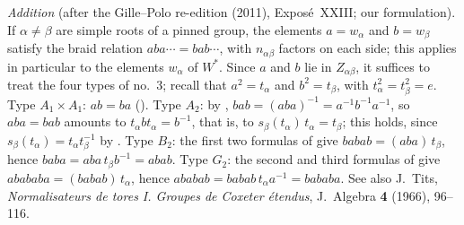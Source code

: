\emph{Addition} (after the Gille--Polo re-edition (2011), Exposé~XXIII; our
formulation). If \(\alpha\ne\beta\) are simple roots of a pinned group, the elements
\(a=w_\alpha\) and \(b=w_\beta\) satisfy the braid relation \(aba\cdots=bab\cdots\),
with \(n_{\alpha\beta}\) factors on each side; this applies in particular to the elements
\(w_\alpha\) of \(W^*\). Since \(a\) and \(b\) lie in \(Z_{\alpha\beta}\), it suffices to
treat the four types of no.~3; recall that \(a^2=t_\alpha\) and \(b^2=t_\beta\), with
\(t_\alpha^2=t_\beta^2=e\). Type \(A_1\times A_1\): \(ab=ba\)
(). Type \(A_2\): by
, \(bab=(aba)^{-1}=a^{-1}b^{-1}a^{-1}\), so
\(aba=bab\) amounts to \(t_\alpha bt_\alpha=b^{-1}\), that is, to
\(s_\beta(t_\alpha)\,t_\alpha=t_\beta\); this holds, since
\(s_\beta(t_\alpha)=t_\alpha t_\beta^{-1}\) by
. Type \(B_2\): the first two formulas of
 give \(babab=(aba)\,t_\beta\), hence
\(baba=aba\,t_\beta b^{-1}=abab\). Type \(G_2\): the second and third formulas of
 give \(abababa=(babab)\,t_\alpha\), hence
\(ababab=babab\,t_\alpha a^{-1}=bababa\). See also J.~Tits, \textit{Normalisateurs de
tores I. Groupes de Coxeter étendus}, J.~Algebra \textbf{4} (1966), 96--116.
